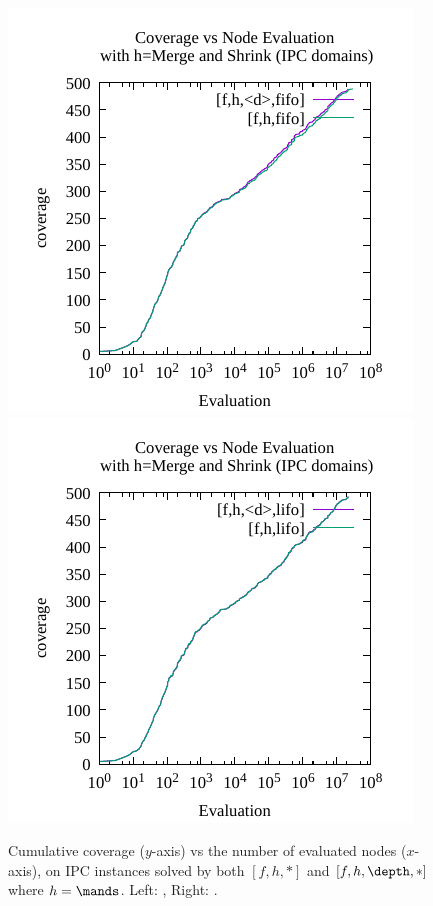 \begin{figure}[htbp]
 \centering
 \includegraphics{img/node-sec/mnhiF-mnh_F-benchmark-cumulative.pdf}
 \includegraphics{img/node-sec/mnhiL-mnh_L-benchmark-cumulative.pdf}
 \caption{
 Cumulative coverage ($y$-axis) vs the number of evaluated nodes ($x$-axis),
 on IPC instances solved by both $[f,h,*]$ and $[f,h,\depth,*]$ where $h=\mands$.
 Left: \fifo, Right: \lifo.
}
\end{figure}
